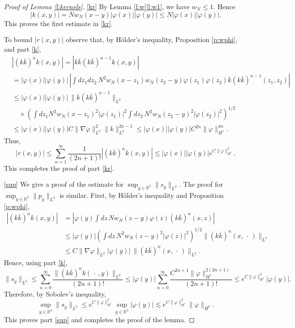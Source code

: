 \documentclass[11pt,a4paper,draft,DIV11]{scrartcl}	%
\newcommand{\R}{\mathds{R}}
\begin{document}
\begin{proof}[Proof of Lemma \ref{l:kernels}]
  \ref{kr} By Lemma \ref{l:w}\ref{l:w1}, we have $w_N \leq 1$. Hence
  \[
    |k(x,y)| = N w_N(x-y) |\varphi(x)| |\varphi(y)| \leq N |\varphi(x)|
    |\varphi(y)|.
  \]
  This proves the first estimate in \ref{kr}.
   
  To bound $\lvert r(x,y)\rvert$ observe that, by H\"older's inequality,
  Proposition \ref{p:wphi}, and part \ref{k},
  \begin{align*}
    & |( k \overline{k})^n k(x,y)| = | k \overline{k} ( k \overline{k})^{n-1}
    k(x,y)| \\
    & = |\varphi(x)| |\varphi(y)| \, \left| \int dz_1 dz_2 \, N^2 w_N(x-z_1)
    w_N(z_2-y) \varphi(z_1) \varphi(z_2) \overline{k}(k
    \overline{k})^{n-1}(z_1,z_2) \right| \\
    & \le |\varphi(x)| |\varphi(y)| \, \| \overline{k} (k \overline{k})^{n-1}
    \|_{L^2} \\
    & \quad \times \left( \int dz_1 N^2 w_N(x-z_1)^2 |\varphi(z_1)|^2 \int
    dz_2 \, N^2 w_N(z_2-y)^2 |\varphi(z_2)|^2 \right)^{1/2} \\
    & \le |\varphi(x)| |\varphi(y)| C \| \nabla \varphi \|_{L^2}^2 \| k
    \|_{L^2}^{2n-1} \le |\varphi(x)| |\varphi(y)| C^{2n} \| \varphi
    \|_{H^1}^{4n}.
  \end{align*}
  Thus,
  \[
    |r(x,y)| \le \sum_{n=1}^\infty \frac{1}{(2n+1)!} |( k \overline{k})^n k
    (x,y)|\le |\varphi(x)| |\varphi(y)| e^{C \| \varphi \|_{H^1}^2}.
  \]
  This completes the proof of part \ref{kr}.


  \ref{sup} We give a proof of the estimate for $\sup_{y \in \R^3} \| s_y
  \|_{L^2}$. The proof for $\sup_{y \in \R^3} \| p_y \|_{L^2}$ is similar.
  First, by H\"older's inequality and Proposition \ref{p:wphi},
  \begin{align*}
    |(k \overline{k})^n k(x,y)| & = \left| \varphi(y) \int dz \, N w_N(z-y)
    \varphi(z) (k \overline{k})^n(x,z) \right| \\
    & \le |\varphi(y)| \left( \int dz \, N^2 w_N(z-y)^2 |\varphi(z)|^2
    \right)^{1/2} \| (k \overline{k})^n(x,\, \cdot\,) \|_{L^2} \\
    & \le C \| \nabla \varphi \|_{L^2} | \varphi(y)| \, \| (k \overline{k}
    )^n(x,\, \cdot\,) \|_{L^2}.
  \end{align*}
  Hence, using part \ref{k},
  \[
    \| s_y \|_{L^2} \le \sum_{n=0}^\infty \frac{\| (k \overline{k})^n k(\,
    \cdot\,,y) \|_{L^2}}{(2n+1)!} \le |\varphi(y)| \sum_{n=0}^\infty
    \frac{C^{2n+1} \| \varphi \|_{H^1}^{2(2n+1)}}{(2n+1)!} \le e^{C \|
    \varphi\|_{H^1}^2} |\varphi(y)|.
  \]
  Therefore, by Sobolev's inequality,
  \[
    \sup_{y \in \R^3} \| s_y \|_{L^2} \le e^{C \| \varphi \|_{H^1}^2} \sup_{y
    \in \R^3} |\varphi(y)| \apprle e^{C \| \varphi \|_{H^1}^2} \| \varphi
    \|_{H^2}.
  \]
  This proves part \ref{sup} and completes the proof of the lemma.
\end{proof}
\end{document}
